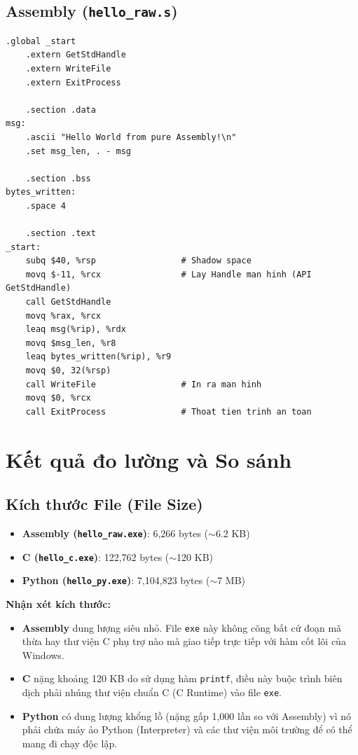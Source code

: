 \documentclass[12pt,a4paper]{article}
\begin{document}
\subsection{Assembly (\texttt{hello\_raw.s})}
\begin{lstlisting}[language={[x86masm]Assembler}]
    .global _start
    .extern GetStdHandle
    .extern WriteFile
    .extern ExitProcess

    .section .data
msg:
    .ascii "Hello World from pure Assembly!\n"
    .set msg_len, . - msg

    .section .bss
bytes_written:
    .space 4

    .section .text
_start:
    subq $40, %rsp                 # Shadow space
    movq $-11, %rcx                # Lay Handle man hinh (API GetStdHandle)
    call GetStdHandle
    movq %rax, %rcx                
    leaq msg(%rip), %rdx           
    movq $msg_len, %r8             
    leaq bytes_written(%rip), %r9  
    movq $0, 32(%rsp)              
    call WriteFile                 # In ra man hinh
    movq $0, %rcx
    call ExitProcess               # Thoat tien trinh an toan
\end{lstlisting}
\section{Kết quả đo lường và So sánh}

\subsection{Kích thước File (File Size)}
\begin{itemize}
    \item \textbf{Assembly (\texttt{hello\_raw.exe})}: 6,266 bytes ($\sim$6.2 KB)
    \item \textbf{C (\texttt{hello\_c.exe})}: 122,762 bytes ($\sim$120 KB)
    \item \textbf{Python (\texttt{hello\_py.exe})}: 7,104,823 bytes ($\sim$7 MB)
\end{itemize}

\textbf{Nhận xét kích thước:}
\begin{itemize}
    \item \textbf{Assembly} dung lượng siêu nhỏ. File \texttt{exe} này không cõng bất cứ đoạn mã thừa hay thư viện C phụ trợ nào mà giao tiếp trực tiếp với hàm cốt lõi của Windows.
    \item \textbf{C} nặng khoảng 120 KB do sử dụng hàm \texttt{printf}, điều này buộc trình biên dịch phải nhúng thư viện chuẩn C (C Runtime) vào file \texttt{exe}.
    \item \textbf{Python} có dung lượng khổng lồ (nặng gấp 1,000 lần so với Assembly) vì nó phải chứa máy ảo Python (Interpreter) và các thư viện môi trường để có thể mang đi chạy độc lập.
\end{itemize}
\end{document}
